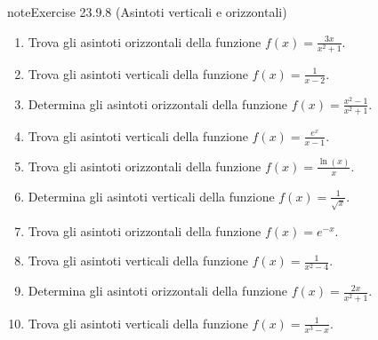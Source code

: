 \documentclass[letterpaper,10pt,italian]{jupyterBook}
\begin{document}
\begin{sphinxadmonition}{note}{Exercise 23.9.8 (Asintoti verticali e orizzontali)}


\begin{enumerate}
%
\item {} 
\sphinxAtStartPar
Trova gli asintoti orizzontali della funzione \(f(x) = \frac{3x}{x^2 + 1}\).

\item {} 
\sphinxAtStartPar
Trova gli asintoti verticali della funzione \(f(x) = \frac{1}{x - 2}\).

\item {} 
\sphinxAtStartPar
Determina gli asintoti orizzontali della funzione \(f(x) = \frac{x^2 - 1}{x^2 + 1}\).

\item {} 
\sphinxAtStartPar
Trova gli asintoti verticali della funzione \(f(x) = \frac{e^x}{x - 1}\).

\item {} 
\sphinxAtStartPar
Trova gli asintoti orizzontali della funzione \(f(x) = \frac{\ln(x)}{x}\).

\item {} 
\sphinxAtStartPar
Determina gli asintoti verticali della funzione \(f(x) = \frac{1}{\sqrt{x}}\).

\item {} 
\sphinxAtStartPar
Trova gli asintoti orizzontali della funzione \(f(x) = e^{-x}\).

\item {} 
\sphinxAtStartPar
Trova gli asintoti verticali della funzione \(f(x) = \frac{1}{x^2 - 4}\).

\item {} 
\sphinxAtStartPar
Determina gli asintoti orizzontali della funzione \(f(x) = \frac{2x}{x^2 + 1}\).

\item {} 
\sphinxAtStartPar
Trova gli asintoti verticali della funzione \(f(x) = \frac{1}{x^3 - x}\).

\end{enumerate}
\end{sphinxadmonition}


 \label{exercise:ch/infinitesimal_calculus/analysis-problems-exercise-8}
\end{document}
